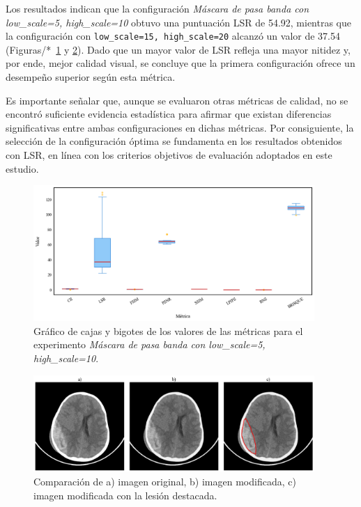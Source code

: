 Los resultados indican que la configuración \textit{Máscara de pasa banda con low\_scale=5, high\_scale=10} obtuvo una puntuación LSR de 54.92, mientras que la configuración con \texttt{low\_scale=15, high\_scale=20} alcanzó un valor de 37.54 (Figuras/*~\ref{fig:boxplot-bandpass} y \ref{fig:comparison-bandpass}). Dado que un mayor valor de LSR refleja una mayor nitidez y, por ende, mejor calidad visual, se concluye que la primera configuración ofrece un desempeño superior según esta métrica.

Es importante señalar que, aunque se evaluaron otras métricas de calidad, no se encontró suficiente evidencia estadística para afirmar que existan diferencias significativas entre ambas configuraciones en dichas métricas. Por consiguiente, la selección de la configuración óptima se fundamenta en los resultados obtenidos con LSR, en línea con los criterios objetivos de evaluación adoptados en este estudio.

\begin{figure}[H]
    \centering
    \includegraphics[width=0.95\textwidth]{Graphics/boxplot-bandpass-mask.png}
    \caption{Gráfico de cajas y bigotes de los valores de las métricas para el experimento \textit{Máscara de pasa banda con low\_scale=5, high\_scale=10}.}
    \label{fig:boxplot-bandpass}
\end{figure}

\begin{figure}[H]
    \centering
    \includegraphics[width=0.95\textwidth]{Graphics/comparison-bandpass.png}
    \caption{Comparación de a) imagen original, b) imagen modificada, c) imagen modificada con la lesión destacada.}
    \label{fig:comparison-bandpass}
\end{figure}

